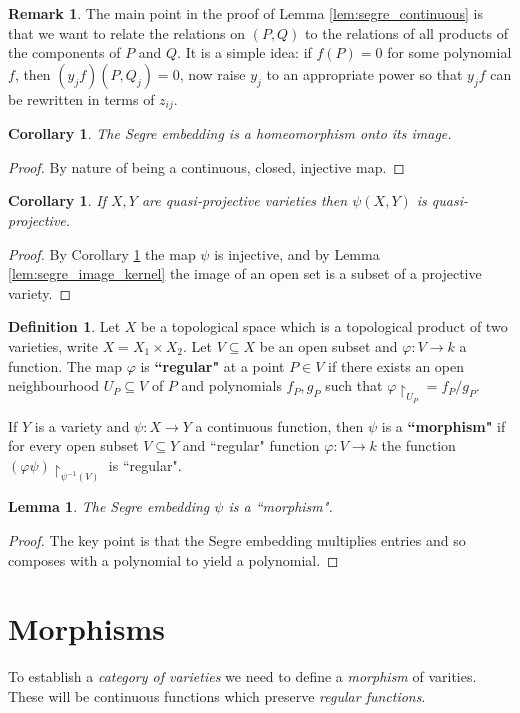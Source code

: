 \documentclass[12pt]{article}
\theoremstyle{plain}
\newtheorem{lemma}[thm]{Lemma}
\newtheorem{cor}[thm]{Corollary}
\theoremstyle{definition}
\newtheorem{defn}[thm]{Definition} %
\newtheorem{remark}[thm]{Remark}
\newcommand{\lto}{\longrightarrow}
\begin{document}
\begin{remark}
The main point in the proof of Lemma \ref{lem:segre_continuous} is that we want to relate the relations on $(P,Q)$ to the relations of all products of the components of $P$ and $Q$. It is a simple idea: if $f(P) = 0$ for some polynomial $f$, then $(y_jf)(P,Q_j) = 0$, now raise $y_j$ to an appropriate power so that $y_jf$ can be rewritten in terms of $z_{ij}$.
\end{remark}
\begin{cor}\label{cor:homeo}
The Segre embedding is a homeomorphism onto its image.
\end{cor}
\begin{proof}
By nature of being a continuous, closed, injective map.
\end{proof}
\begin{cor}
If $X,Y$ are quasi-projective varieties then $\psi(X, Y)$ is quasi-projective.
\end{cor}
\begin{proof}
By Corollary \ref{cor:homeo} the map $\psi$ is injective, and by Lemma \ref{lem:segre_image_kernel} the image of an open set is a subset of a projective variety.
\end{proof}
\begin{defn}
Let $X$ be a topological space which is a topological product of two varieties, write $X = X_1 \times X_2$. Let $V \subseteq X$ be an open subset and $\varphi: V \lto k$ a function. The map $\varphi$ is \textbf{``regular"} at a point $P \in V$ if there exists an open neighbourhood $U_P \subseteq V$ of $P$ and polynomials $f_P,g_P$ such that $\varphi\restriction_{U_P} = f_P/g_P$.

If $Y$ is a variety and $\psi: X \lto Y$ a continuous function, then $\psi$ is a \textbf{``morphism"} if for every open subset $V \subseteq Y$ and ``regular" function $\varphi: V \lto k$ the function $(\varphi \psi)\restriction_{\psi^{-1}(V)}$ is ``regular".
\end{defn}
\begin{lemma}
The Segre embedding $\psi$ is a ``morphism".
\end{lemma}
\begin{proof}
The key point is that the Segre embedding multiplies entries and so composes with a polynomial to yield a polynomial.
\end{proof}


\section{Morphisms}
To establish a \emph{category of varieties} we need to define a \emph{morphism} of varities. These will be continuous functions which preserve \emph{regular functions}.
\end{document}
